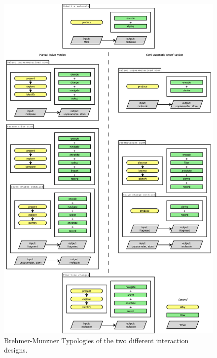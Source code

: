 \begin{figure}[h!]
\begin{center}
\includegraphics[width=\textwidth]{img/complete_typology.pdf}
\caption{Brehmer-Munzner Typologies of the two different interaction designs.}
\vspace{-2cm}
\end{center}
\end{figure}


